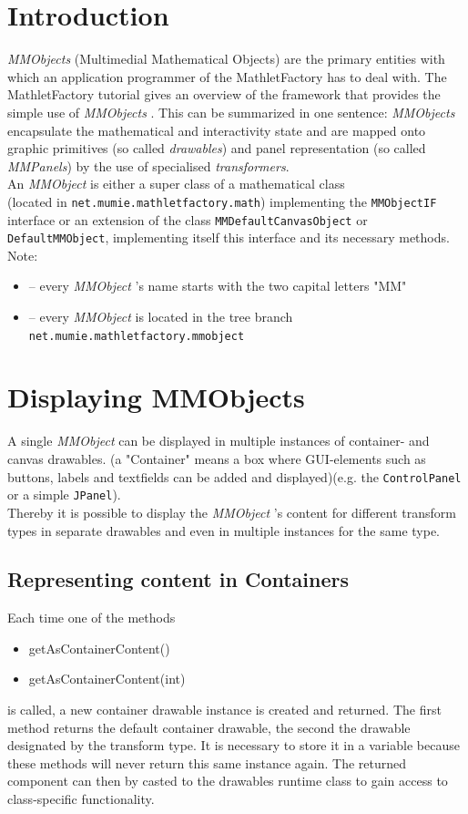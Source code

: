 \documentclass[a4paper,12pt]{book}
\newcommand{\mmo}{\emph{MMObject }}
\newcommand{\mmos}{\emph{MMObjects }}
\begin{document}
\section{Introduction}
  \mmos (Multimedial Mathematical Objects) are the primary entities with which 
  an application programmer of the MathletFactory has to deal with. The MathletFactory 
  tutorial gives an overview of the framework that provides the simple use of \mmos. 
  This can be summarized in one sentence: \mmos encapsulate the mathematical and 
  interactivity state and are mapped onto graphic primitives (so called {\it drawables}) 
  and panel representation (so called {\it MMPanels}) by the use of specialised 
  {\it transformers}.\\
  An \mmo is either a super class of a mathematical class\\(located in \verb|net.mumie.mathletfactory.math|)
  implementing the \verb|MMObjectIF| interface or an extension of the class \verb|MMDefaultCanvasObject|
  or \verb|DefaultMMObject|, implementing 
  itself this interface and its necessary methods.\\
  Note: \\
  \begin{itemize}
    \item -- every \mmo's name starts with the two capital letters "MM"
    \item -- every \mmo is located in the tree branch \verb|net.mumie.mathletfactory.mmobject|
  \end{itemize}
  
  
\section{Displaying MMObjects}
  A single \mmo can be displayed in multiple instances of container- and canvas drawables.
  (a "Container" means a box where GUI-elements such as buttons, labels and textfields
  can be added and displayed)(e.g. the \verb|ControlPanel| or a simple \verb|JPanel|).\\
  Thereby it is possible to display the \mmo's content for different transform types
  in separate drawables and even in multiple instances for the same type.
  
 \subsection{Representing content in Containers}
    Each time one of the methods
     \begin{itemize}
      \item getAsContainerContent()
      \item getAsContainerContent(int)
    \end{itemize}
    is called, a new container drawable instance is created and returned. The first
    method returns the default container drawable, the second the drawable designated
    by the transform type. It is necessary to store it in a variable because these
    methods will never return this same instance again. The returned component can
    then by casted to the drawables runtime class to gain access to class-specific 
    functionality.
  
\end{document}
